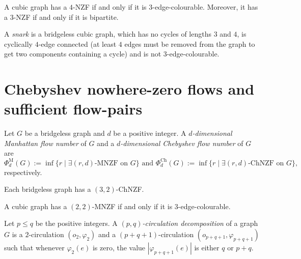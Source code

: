 \begin{proposition} \emph{\cite[pp. 160, 161]{diestel}}
    A cubic graph has a $4$-NZF if and only if it is $3$-edge-colourable. Moreover, it has a $3$-NZF if and only if it is bipartite.
\end{proposition}

\begin{definition}
    A \emph{snark} is a bridgeless cubic graph, which has no cycles of lengths $3$ and $4$, is cyclically $4$-edge connected (at least $4$ edges must be removed from the graph to get two components containing a cycle) and is not $3$-edge-colourable.
\end{definition}

\section{Chebyshev nowhere-zero flows and sufficient flow-pairs}

\begin{definition}
	Let $G$ be a bridgeless graph and $d$ be a positive integer. A \emph{$d$-dimensional Manhattan flow number} of $G$ and a \emph{$d$-dimensional Chebyshev flow number} of $G$ are
	\begin{equation*}
		\Phi_d^\text{M}(G) := \inf\{r\mid\exists(r, d)\text{-MNZF on }G\}\text{ and } \Phi_d^\text{Ch}(G) := \inf\{r\mid\exists(r, d)\text{-ChNZF on }G\},
	\end{equation*}
 respectively.
\end{definition}

\begin{proposition}
    Each bridgeless graph has a $(3, 2)$-ChNZF.\label{prop:manhattan_upper_seymour}
\end{proposition}

\begin{theorem}
    A cubic graph has a $(2, 2)$-MNZF if and only if it is $3$-edge-colourable.\label{th:2_mnzf_iff_3_col}
\end{theorem}

\begin{definition}
        Let $p\leq q$ be the positive integers. A \emph{$(p,q)$-circulation decomposition} of a graph $G$ is a $2$-circulation $(o_2,\varphi_2)$ and a $(p+q+1)$-circulation $(o_{p+q+1}, \varphi_{p+q+1})$ such that whenever $\varphi_2(e)$ is zero, the value $|\varphi_{p+q+1}(e)|$ is either $q$ or $p+q$.
\end{definition}

